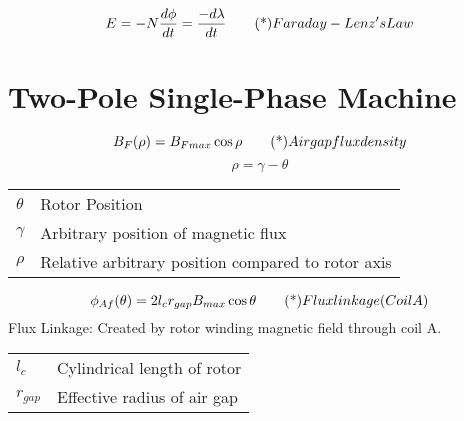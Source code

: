 \documentclass[letterpaper, 10pt]{article}
\begin{document}
\scriptsize
\begin{multicols*}{4}
  \[E = -N \frac{d\phi}{dt} = \frac{-d\lambda}{dt} \eqd{Faraday-Lenz's Law} \]

  \section{Two-Pole Single-Phase Machine}
  \[B_{F}(\rho) = B_{Fmax} \cos{\rho} \eqd{Airgap flux density}\]
  \[\rho = \gamma - \theta\]
  \begin{tabularx}{\linewidth}{l X}
    \(\theta\) & Rotor Position \\
    \(\gamma\) & Arbitrary position of magnetic flux \\
    \(\rho\) & Relative arbitrary position compared to rotor axis
  \end{tabularx}

  \[\phi_{Af}(\theta) = 2 l_c r_{gap} B_{max} \cos{\theta} \eqd{Flux linkage (Coil A)}\]
  Flux Linkage: Created by rotor winding magnetic field through coil A.
  \begin{tabularx}{\linewidth}{l X}
    \(l_c\) & Cylindrical length of rotor \\
    \(r_{gap}\) & Effective radius of air gap
  \end{tabularx}
  
\end{multicols*}
\end{document}
